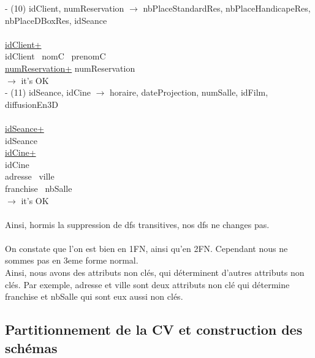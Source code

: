 \documentclass[a4paper,sffamily,12pt]{article}
\begin{document}
				\noindent - (10) idClient, numReservation $\rightarrow$ nbPlaceStandardRes, nbPlaceHandicapeRes, nbPlaceDBoxRes, idSeance \\
					\\
					\underline{idClient+} \\
					idClient \ nomC \ prenomC \\
					\underline{numReservation+}
					numReservation \\									
				$\rightarrow$ it's OK \\		

				\noindent - (11) idSeance, idCine $\rightarrow$ horaire, dateProjection, numSalle, idFilm, diffusionEn3D \\
					\\
					\underline{idSeance+} \\
					idSeance \\
					\underline{idCine+}\\
					idCine \\ adresse \ ville \\ franchise \ nbSalle \\							
				$\rightarrow$ it's OK \\							
				\\		
				\noindent Ainsi, hormis la suppression de dfs transitives, nos dfs ne changes pas. \\																
				\\
				On constate que l'on est bien en 1FN, ainsi qu'en 2FN. Cependant nous ne sommes pas en 3eme forme normal. \\
				Ainsi, nous avons des attributs non clés, qui déterminent d'autres attributs non clés. Par exemple, adresse et ville sont deux attributs non clé qui détermine franchise et nbSalle qui sont eux aussi non clés. \\
				
				\vspace{0.5cm}
													
			\subsection{Partitionnement de la CV et construction des schémas} 	
			
				\vspace{0.5cm}
			
\end{document}
